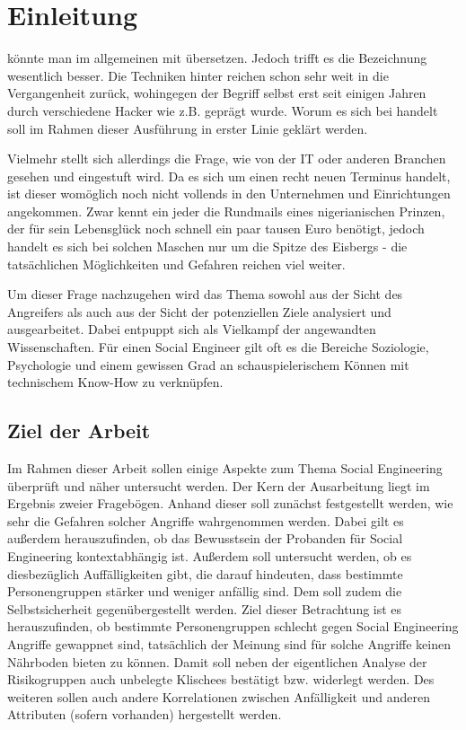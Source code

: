 \section{Einleitung}\label{sec:2_einleitung}
 könnte man im allgemeinen mit  übersetzen.
Jedoch trifft es die Bezeichnung  wesentlich besser.
Die Techniken hinter  reichen schon sehr weit in die Vergangenheit zurück, wohingegen der Begriff selbst erst seit einigen Jahren durch verschiedene Hacker wie z.B.  geprägt wurde.
Worum es sich bei  handelt soll im Rahmen dieser Ausführung in erster Linie geklärt werden.

Vielmehr stellt sich allerdings die Frage, wie  von der IT oder anderen Branchen gesehen und eingestuft wird.
Da es sich um einen recht neuen Terminus handelt, ist dieser womöglich noch nicht vollends in den Unternehmen und Einrichtungen angekommen.
Zwar kennt ein jeder die Rundmails eines nigerianischen Prinzen, der für sein Lebensglück noch schnell ein paar tausen Euro benötigt, jedoch handelt es sich bei solchen Maschen nur um die Spitze des Eisbergs  - die tatsächlichen Möglichkeiten und Gefahren reichen viel weiter.

Um dieser Frage nachzugehen wird das Thema sowohl aus der Sicht des Angreifers als auch aus der Sicht der potenziellen Ziele analysiert und ausgearbeitet.
Dabei entpuppt sich  als Vielkampf der angewandten Wissenschaften.
Für einen Social Engineer gilt oft es die Bereiche Soziologie, Psychologie und einem gewissen Grad an schauspielerischem Können mit technischem Know-How zu verknüpfen.

\subsection{Ziel der Arbeit}\label{sec:ziel_der_arbeit}
Im Rahmen dieser Arbeit sollen einige Aspekte zum Thema Social Engineering überprüft und näher untersucht werden.
Der Kern der Ausarbeitung liegt im Ergebnis zweier Fragebögen.
Anhand dieser soll zunächst festgestellt werden, wie sehr die Gefahren solcher Angriffe wahrgenommen werden.
Dabei gilt es außerdem herauszufinden, ob das Bewusstsein der Probanden für Social Engineering kontextabhängig ist.
Außerdem soll untersucht werden, ob es diesbezüglich Auffälligkeiten gibt, die darauf hindeuten, dass bestimmte Personengruppen stärker und weniger anfällig sind.
Dem soll zudem die Selbstsicherheit gegenübergestellt werden.
Ziel dieser Betrachtung ist es herauszufinden, ob bestimmte Personengruppen schlecht gegen Social Engineering Angriffe gewappnet sind, tatsächlich der Meinung sind für solche Angriffe keinen Nährboden bieten zu können.
Damit soll neben der eigentlichen Analyse der Risikogruppen auch unbelegte Klischees bestätigt bzw. widerlegt werden.
Des weiteren sollen auch andere Korrelationen zwischen Anfälligkeit und anderen Attributen (sofern vorhanden) hergestellt werden.

